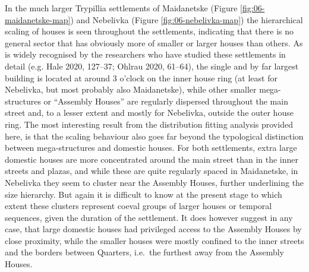 \documentclass[
  12pt,
  a4paper, twoside]{book}
\begin{document}
In the much larger Trypillia settlements of Maidanetske (Figure \ref{fig:06-maidanetske-map}) and Nebelivka (Figure \ref{fig:06-nebelivka-map}) the hierarchical scaling of houses is seen throughout the settlements, indicating that there is no general sector that has obviously more of smaller or larger houses than others. As is widely recognised by the researchers who have studied these settlements in detail (e.g. Hale 2020, 127--37; Ohlrau 2020, 61--64), the single and by far largest building is located at around 3 o'clock on the inner house ring (at least for Nebelivka, but most probably also Maidanetske), while other smaller mega-structures or ``Assembly Houses'' are regularly dispersed throughout the main street and, to a lesser extent and mostly for Nebelivka, outside the outer house ring. The most interesting result from the distribution fitting analysis provided here, is that the scaling behaviour also goes far beyond the typological distinction between mega-structures and domestic houses. For both settlements, extra large domestic houses are more concentrated around the main street than in the inner streets and plazas, and while these are quite regularly spaced in Maidanetske, in Nebelivka they seem to cluster near the Assembly Houses, further underlining the size hierarchy. But again it is difficult to know at the present stage to which extent these clusters represent coeval groups of larger houses or temporal sequences, given the duration of the settlement. It does however suggest in any case, that large domestic houses had privileged access to the Assembly Houses by close proximity, while the smaller houses were mostly confined to the inner streets and the borders between Quarters, i.e.~the furthest away from the Assembly Houses.
\end{document}

